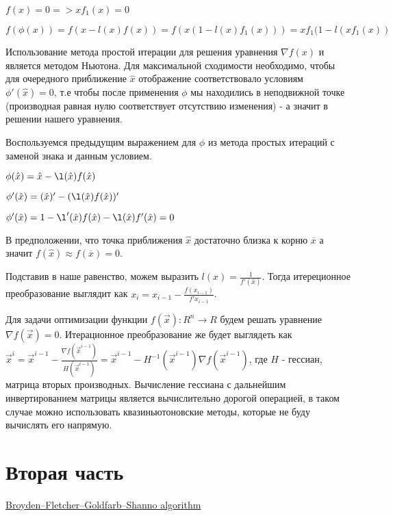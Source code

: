 \documentclass[12pt]{article}
\begin{document}
$f(x) = 0 => xf_1(x) = 0$

$f(\phi(x)) = f(x - l(x)f(x)) = f(x(1 - l(x)f_1(x))) = xf_1(1 - l(xf_1(x))$

Использование метода простой итерации для решения уравнения $\nabla f(x)$ и является методом Ньютона. Для максимальной сходимости необходимо, чтобы для очередного приближение $\hat{x}$ отображение соответствовало условиям $\phi'(\hat{x}) = 0$, т.е чтобы после применения $\phi$ мы находились в неподвижной точке (производная равная нулю соответствует отсутствию изменения) - а значит в решении нашего уравнения.

Воспользуемся предыдущим выражением для $\phi$ из метода простых итераций с заменой знака и данным условием.

$\phi(\hat{x}) = \hat{x} - \l(\hat{x})f(\hat{x})$

$\phi'(\hat{x}) = (\hat{x})' - (\l(\hat{x})f(\hat{x}))'$

$\phi'(\hat{x}) = 1 - \l'(\hat{x})f(\hat{x}) - \l(\hat{x})f'(\hat{x}) = 0$

В предположении, что точка приближения $\hat{x}$ достаточно близка к корню $\overline{x}$ а значит $f(\hat{x}) \approx f(\overline{x}) = 0$.

Подставив в наше равенство, можем выразить $l(x) = \frac{1}{f'(\hat{x})}$. Тогда итереционное преобразование выглядит как $x_{i} = x_{i - 1} - \frac{f(x_{i - 1})}{f'{x_{i - 1}}}$.

Для задачи оптимизации функции $f(\vec{x}): R^n \rightarrow R$ будем решать уравнение $\nabla f(\vec{x}) = 0$. Итерационное преобразование же будет выглядеть как $\vec{x}^{i} = \vec{x}^{i - 1} - \frac{\nabla f(\vec{x}^{i - 1})}{H(\vec{x}^{i - 1})} = \vec{x}^{i - 1} - H^{-1}(\vec{x}^{i - 1}) \nabla f(\vec{x}^{i - 1})$, где $H$ - гессиан, матрица вторых производных. Вычисление гессиана с дальнейшим инвертированием матрицы является вычислительно дорогой операцией, в таком случае можно использовать квазиньютоновские методы, которые не буду вычислять его напрямую.


\section{Вторая часть} 


\begin{thebibliography}{0}
 \href{https://en.wikipedia.org/wiki/Broyden%E2%80%93Fletcher%E2%80%93Goldfarb%E2%80%93Shanno_algorithm}{Broyden–Fletcher–Goldfarb–Shanno algorithm}


\end{thebibliography}
\end{document}
